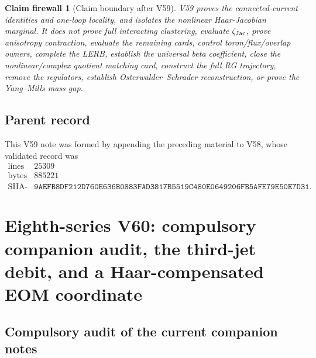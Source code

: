 \documentclass[11pt,oneside]{book}
\newtheorem{firewall}[theorem]{Claim firewall}
\theoremstyle{definition}
\theoremstyle{remark}
\begin{document}
\begin{firewall}[Claim boundary after V59]
\label{fire:e8v59-claim}
V59 proves the connected-current identities and one-loop locality,
and isolates the nonlinear Haar-Jacobian marginal.  It does not
prove full interacting clustering, evaluate
\(\zeta_{\rm Jac}\), prove anisotropy contraction, evaluate the
remaining cards, control toron/flux/overlap owners, complete the
LERB, establish the universal beta coefficient, close the
nonlinear/complex quotient matching card, construct the full RG
trajectory, remove the regulators, establish
Osterwalder--Schrader reconstruction, or prove the Yang--Mills mass
gap.
\end{firewall}

\subsection{Parent record}

This V59 note was formed by appending the preceding material to V58,
whose validated record was
\[
\begin{array}{c|c}
\text{lines}&25309\\
\text{bytes}&885221\\
\text{SHA-256}&
\texttt{9AEFB8DF212D760E636B0883FAD3817B5519C480E0649206FB5AFE79E50E7D31}.
\end{array}
\]



\section{Eighth-series V60: compulsory companion audit, the third-jet
debit, and a Haar-compensated EOM coordinate}
\label{sec:e8v60}

\subsection{Compulsory audit of the current companion notes}
\end{document}
